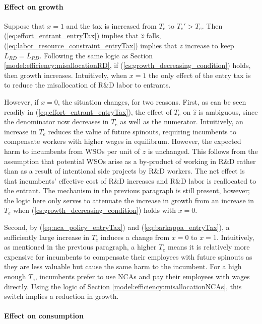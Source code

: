 \documentclass[11pt,english]{article}
\begin{document}
\paragraph{Effect on growth}

Suppose that $x = 1$ and the tax is increased from $T_e$ to $T_e' > T_e$. Then (\ref{eq:effort_entrant_entryTax}) implies that $\hat{z}$ falls, (\ref{eq:labor_resource_constraint_entryTax}) implies that $z$ increase to keep $L_{RD} = \bar{L}_{RD}$. Following the same logic as Section \ref{model:efficiency:misallocationRD}, if (\ref{cs:growth_decreasing_condition}) holds, then growth increases. Intuitively, when $x = 1$ the only effect of the entry tax is to reduce the misallocation of R\&D labor to entrants. 

However, if $x = 0$, the situation changes, for two reasons. First, as can be seen readily in (\ref{eq:effort_entrant_entryTax}), the effect of $T_e$ on $\hat{z}$ is ambiguous, since the denominator now decreases in $T_e$ as well as the numerator. Intuitively, an increase in $T_e$ reduces the value of future spinouts, requiring incumbents to compensate workers with higher wages in equilibrum. However, the expected harm to incumbents from WSOs per unit of $z$ is unchanged. This follows from the assumption that potential WSOs arise as a by-product of working in R\&D rather than as a result of intentional side projects by R\&D workers. The net effect is that incumbents' effective cost of R\&D increases and R\&D labor is reallocated to the entrant. The mechanism in the previous paragraph is still present, however; the logic here only serves to attenuate the increase in growth from an increase in $T_e$ when (\ref{cs:growth_decreasing_condition}) holds with $x = 0$.

Second, by (\ref{eq:nca_policy_entryTax}) and (\ref{eq:barkappa_entryTax}), a sufficiently large increase in $T_e$ induces a change from $x = 0$ to $x = 1$. Intuitively, as mentioned in the previous paragraph, a higher $T_e$ means it is relatively more expensive for incumbents to compensate their employees with future spinouts as they are less valuable but cause the same harm to the incumbent. For a high enough $T_e$, incumbents prefer to use NCAs and pay their employees with wages directly. Using the logic of Section \ref{model:efficiency:misallocationNCAs}, this switch implies a reduction in growth.

\paragraph{Effect on consumption}
\end{document}
